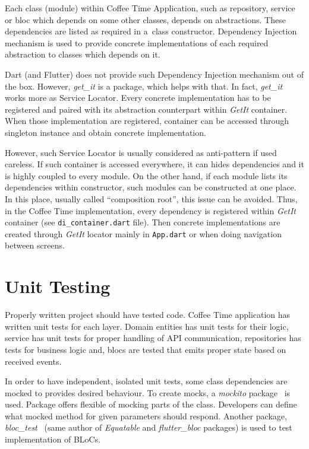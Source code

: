 Each class (module) within Coffee Time Application, such as repository, service or \gls{bloc} which depends on some other classes, depends on abstractions. These dependencies are listed as required in a~class constructor. Dependency Injection mechanism is used to provide concrete implementations of each required abstraction to classes which depends on it. 

Dart (and Flutter) does not provide such Dependency Injection mechanism out of the box. However, \textit{get\_it} is a package, which helps with that. In fact, \textit{get\_it} works more as Service Locator. Every concrete implementation has to be registered and paired with its abstraction counterpart within \textit{GetIt} container. When those implementation are registered, container can be accessed through singleton instance and obtain concrete implementation.

However, such Service Locator is usually considered as anti-pattern if used careless. If such container is accessed everywhere, it can hides dependencies and it is highly coupled to every module. On the other hand, if each module lists its dependencies within constructor, such modules can be constructed at one place. In this place, usually called ``composition root'', this issue can be avoided. Thus, in the Coffee Time implementation, every dependency is registered within \textit{GetIt} container (see \verb|di_container.dart| file). Then concrete implementations are created through \textit{GetIt} locator mainly in \verb|App.dart| or when doing navigation between screens. 

\section{Unit Testing}
Properly written project should have tested code. Coffee Time application has written unit tests for each layer. Domain entities has unit tests for their logic, service has unit tests for proper handling of API communication, repositories has tests for business logic and, \gls{bloc}s are tested that emits proper state based on received events. 

In order to have independent, isolated unit tests, some class dependencies are mocked to provides desired behaviour. To create mocks, a \textit{mockito} package~\cite{package-mockito} is used. Package offers flexible of mocking parts of the class. Developers can define what mocked method for given parameters should respond. Another package, \textit{bloc\_test}~\cite{package-bloctest} (same author of \textit{Equatable} and \textit{flutter\_bloc} packages) is used to test implementation of BLoCs. 

